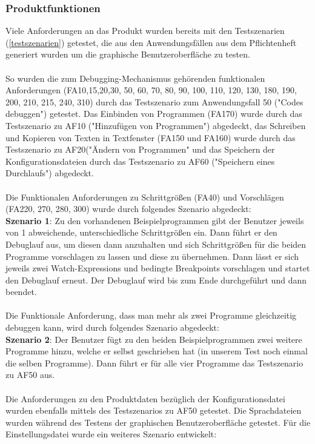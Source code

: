 \documentclass[parskip=full]{scrartcl}
\begin{document}
\subsubsection{Produktfunktionen}
Viele Anforderungen an das Produkt wurden bereits mit den Testszenarien (\ref{testszenarien}) getestet, die aus den Anwendungsfällen aus dem Pflichtenheft generiert wurden um die graphische Benutzeroberfläche zu testen.
\\
 \\
So wurden die zum Debugging-Mechanismus gehörenden funktionalen Anforderungen (FA10,15,20,30, 50, 60, 70, 80, 90, 100, 110, 120, 130, 180, 190, 200, 210, 215, 240, 310) durch das Testszenario zum Anwendungsfall 50 ("Codes debuggen") getestet.
Das Einbinden von Programmen (FA170) wurde durch das Testszenario zu AF10 ("Hinzufügen von Programmen") abgedeckt, das Schreiben und Kopieren von Texten in Textfenster (FA150 und FA160) wurde durch das Testszenario zu AF20("Ändern von Programmen" und das Speichern der Konfigurationsdateien durch das Testszenario zu AF60 ("Speichern eines Durchlaufs") abgedeckt.
\\
 \\
Die Funktionalen Anforderungen zu Schrittgrößen (FA40) und Vorschlägen (FA220, 270, 280, 300) wurde durch folgendes Szenario abgedeckt: \\
\textbf{Szenario 1}: Zu den vorhandenen Beispielprogrammen gibt der Benutzer jeweils von 1 abweichende, unterschiedliche Schrittgrößen ein. Dann führt er den Debuglauf aus, um diesen dann anzuhalten und sich Schrittgrößen für die beiden Programme vorschlagen zu lassen und diese zu übernehmen. Dann lässt er sich jeweils zwei Watch-Expressions und bedingte Breakpoints vorschlagen und startet den Debuglauf erneut. Der Debuglauf wird bis zum Ende durchgeführt und dann beendet.
\\
 \\
Die Funktionale Anforderung, dass man mehr als zwei Programme gleichzeitig debuggen kann, wird durch folgendes Szenario abgedeckt: 
\\
\textbf{Szenario 2}: Der Benutzer fügt zu den beiden Beispielprogrammen zwei weitere Programme hinzu, welche er selbst geschrieben hat (in unserem Test noch einmal die selben Programme). Dann führt er für alle vier Programme das Testszenario zu AF50 aus.
\\
 \\
Die Anforderungen zu den Produktdaten bezüglich der Konfigurationsdatei wurden ebenfalls mittels des Testszenarios zu AF50 getestet. Die Sprachdateien wurden während des Testens der graphischen Benutzeroberfläche getestet. Für die Einstellungsdatei wurde ein weiteres Szenario entwickelt: \\
\end{document}

